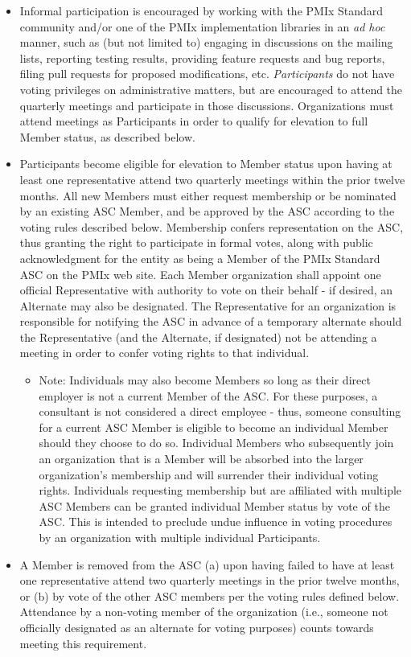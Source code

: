 \documentclass{article}
\providecommand{\tightlist}{%
  \setlength{\itemsep}{0pt}\setlength{\parskip}{0pt}}
\begin{document}
\begin{itemize}
\item
  Informal participation is encouraged by working with the PMIx Standard
  community and/or one of the PMIx implementation libraries in an
  \emph{ad hoc} manner, such as (but not limited to) engaging in
  discussions on the mailing lists, reporting testing results, providing
  feature requests and bug reports, filing pull requests for proposed
  modifications, etc. \textit{Participants} do not have voting
  privileges on administrative matters, but are encouraged to attend the
  quarterly meetings and participate in those discussions. Organizations
  must attend meetings as Participants in order to qualify for elevation
  to full Member status, as described below.
\item
  Participants become eligible for elevation to Member status upon
  having at least one representative attend two quarterly meetings
  within the prior twelve months. All new Members must either request
  membership or be nominated by an existing ASC Member, and be approved
  by the ASC according to the voting rules described below. Membership
  confers representation on the ASC, thus granting the right to
  participate in formal votes, along with public acknowledgment for the
  entity as being a Member of the PMIx Standard ASC on the PMIx web
  site. Each Member organization shall appoint one official
  Representative with authority to vote on their behalf - if desired, an
  Alternate may also be designated. The Representative for an
  organization is responsible for notifying the ASC in advance of a
  temporary alternate should the Representative (and the Alternate, if
  designated) not be attending a meeting in order to confer voting
  rights to that individual.

  \begin{itemize}
  \tightlist
  \item
    Note: Individuals may also become Members so long as their direct
    employer is not a current Member of the ASC. For these purposes, a
    consultant is not considered a direct employee - thus, someone
    consulting for a current ASC Member is eligible to become an
    individual Member should they choose to do so. Individual Members
    who subsequently join an organization that is a Member will be
    absorbed into the larger organization's membership and will
    surrender their individual voting rights. Individuals requesting
    membership but are affiliated with multiple ASC Members can be
    granted individual Member status by vote of the ASC. This is
    intended to preclude undue influence in voting procedures by an
    organization with multiple individual Participants.
  \end{itemize}
\item
  A Member is removed from the ASC (a) upon having failed to have at
  least one representative attend two quarterly meetings in the prior
  twelve months, or (b) by vote of the other ASC members per the voting
  rules defined below. Attendance by a non-voting member of the
  organization (i.e., someone not officially designated as an alternate
  for voting purposes) counts towards meeting this requirement.
\end{itemize}
\end{document}
